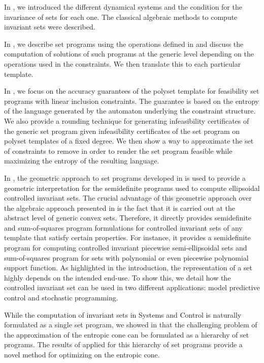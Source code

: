 \documentclass[11pt,twoside,a4paper,openright]{uclouvain-thesis}
\begin{document}
In , we introduced the different dynamical systems
and the condition for the invariance of sets for each one.
The classical algebraic methods to compute invariant sets were described.

In , we describe set programs
using the operations defined in 
and discuss the computation of solutions of such programs at the generic level depending on the operations used in the constraints.
We then translate this to each particular template.

In , we focus on the accuracy guarantees of the polyset template
for feasibility set programs with linear inclusion constraints.
The guarantee is based on the entropy of the language generated by the automaton underlying the constraint structure.
We also provide a rounding technique for generating infeasibility certificates
of the generic set program given infeasibility certificates of the
set program on polyset templates of a fixed degree.
We then show a way to approximate the set of constraints to remove in order to render
the set program feasible while maximizing the entropy of the resulting language.

In , the geometric approach to set programs developed in 
is used to provide a geometric interpretation for the semidefinite programs
used to compute ellipsoidal controlled invariant sets.
The crucial advantage of this geometric approach over the algebraic approach presented in 
is the fact that it is carried out at the abstract level of generic convex sets.
Therefore, it directly provides semidefinite and sum-of-squares program
formulations for controlled invariant sets of any template that satisfy certain properties.
For instance, it provides a semidefinite program for computing controlled invariant piecewise semi-ellipsoidal sets and sum-of-squares program for sets with polynomial or even piecewise polynomial support function.
As highlighted in the introduction, the representation of
a set highly depends on the intended end-use.
To show this, we detail how the controlled invariant set can
be used in two different applications:
model predictive control and stochastic programming.

While the computation of invariant sets in Systems and Control is naturally formulated as a single set program,
we showed in  that the challenging problem of the approximation of the entropic cone can
be formulated as a hierarchy of set programs.
The results of  applied for this hierarchy of set programs provide
a novel method for optimizing on the entropic cone.
\end{document}
